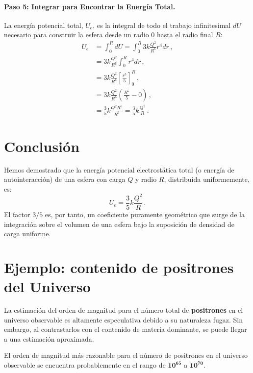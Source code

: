 \documentclass[11pt,a4paper]{book}
\begin{document}
\paragraph{Paso 5: Integrar para Encontrar la Energía Total.}
La energía potencial total, $U_e$, es la integral de todo el trabajo infinitesimal $dU$ necesario para construir la esfera desde un radio 0 hasta el radio final $R$:
\begin{align*}
    U_e &= \int_0^R dU = \int_0^R 3k \frac{Q^2}{R^6} r^4 dr\,, \\
        &= 3k \frac{Q^2}{R^6} \int_0^R r^4 dr\,, \\
        &= 3k \frac{Q^2}{R^6} \left[ \frac{r^5}{5} \right]_0^R\,, \\
        &= 3k \frac{Q^2}{R^6} \left( \frac{R^5}{5} - 0 \right)\,, \\
        &= \frac{3}{5} k \frac{Q^2 R^5}{R^6} = \frac{3}{5} k \frac{Q^2}{R}\,.
\end{align*}

\section*{Conclusión}
Hemos demostrado que la energía potencial electrostática total (o energía de autointeracción) de una esfera con carga $Q$ y radio $R$, distribuida uniformemente, es:
\begin{equation}
    \boxed{
    U_e = \frac{3}{5} k \frac{Q^2}{R}
    }\,.
\end{equation}
El factor $3/5$ es, por tanto, un coeficiente puramente geométrico que surge de la integración sobre el volumen de una esfera bajo la suposición de densidad de carga uniforme.





\section{Ejemplo: contenido de positrones del Universo}
La estimación del orden de magnitud para el número total de \textbf{positrones} en el universo observable es altamente especulativa debido a su naturaleza fugaz. Sin embargo, al contrastarlos con el contenido de materia dominante, se puede llegar a una estimación aproximada.


El orden de magnitud más razonable para el número de positrones en el universo observable se encuentra probablemente en el rango de $\mathbf{10^{65}}$ a $\mathbf{10^{70}}$.
\end{document}

